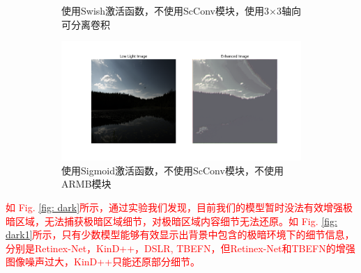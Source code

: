 \documentclass[a4paper]{ctexart}
\begin{document}
\begin{figure}[htb]
\begin{subfigure}{\textwidth}
				\captionsetup{font=scriptsize}
				\caption{使用Swish激活函数，不使用ScConv模块，使用3$\times$3轴向可分离卷积}
				\label{fig: myplot_use_Swish_without_ScConv}	
			\end{subfigure}
			\begin{subfigure}{\textwidth}
				\centering
				\includegraphics[width=0.5\linewidth]{picture/LLIE/Experiment/myplot_use_Sigmoid_without_ARMB}
				\captionsetup{font=scriptsize}
				\caption{使用Sigmoid激活函数，不使用ScConv模块，不使用ARMB模块}
				\label{fig: myplot_use_Sigmoid_without_ARMB}	
			\end{subfigure}
			\caption{
				\label{fig: act}
			}
		\end{figure}
		\FloatBarrier
		
		\textcolor{red}{如 Fig. \ref{fig: dark}所示，通过实验我们发现，目前我们的模型暂时没法有效增强极暗区域，无法捕获极暗区域细节，对极暗区域内容细节无法还原。如 Fig. \ref{fig: dark1}所示，只有少数模型能够有效显示出背景中包含的极暗环境下的细节信息，分别是Retinex-Net，KinD++，DSLR, TBEFN，但Retinex-Net和TBEFN的增强图像噪声过大，KinD++只能还原部分细节。}
		
\end{document}
